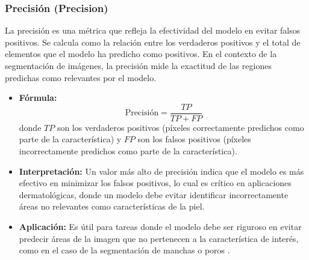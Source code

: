 \subsubsection{Precisión (Precision)}  
La precisión es una métrica que refleja la efectividad del modelo en evitar falsos positivos. Se calcula como la relación entre los verdaderos positivos y el total de elementos que el modelo ha predicho como positivos. En el contexto de la segmentación de imágenes, la precisión mide la exactitud de las regiones predichas como relevantes por el modelo.  
\begin{itemize}
    \item \textbf{Fórmula:}  
    \[
    \text{Precisión} = \frac{TP}{TP + FP}
    \]
    donde \( TP \) son los verdaderos positivos (píxeles correctamente predichos como parte de la característica) y \( FP \) son los falsos positivos (píxeles incorrectamente predichos como parte de la característica).
    \item \textbf{Interpretación:} Un valor más alto de precisión indica que el modelo es más efectivo en minimizar los falsos positivos, lo cual es crítico en aplicaciones dermatológicas, donde un modelo debe evitar identificar incorrectamente áreas no relevantes como características de la piel.
    \item \textbf{Aplicación:} Es útil para tareas donde el modelo debe ser riguroso en evitar predecir áreas de la imagen que no pertenecen a la característica de interés, como en el caso de la segmentación de manchas o poros \cite{autor2019precision}.
\end{itemize}

